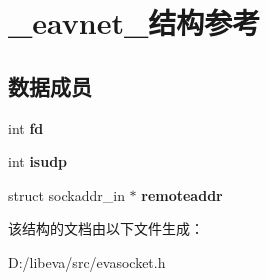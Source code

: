 \hypertarget{struct__eavnet__}{\section{\-\_\-eavnet\-\_\-结构参考}
\label{struct__eavnet__}
}
\subsection*{数据成员}
\begin{DoxyCompactItemize}
\item 
\hypertarget{struct__eavnet___a6f8059414f0228f0256115e024eeed4b}{int {\bfseries fd}}\label{struct__eavnet___a6f8059414f0228f0256115e024eeed4b}

\item 
\hypertarget{struct__eavnet___a0dc807a638900220323c33cd7964136d}{int {\bfseries isudp}}\label{struct__eavnet___a0dc807a638900220323c33cd7964136d}

\item 
\hypertarget{struct__eavnet___a08130e16431b383b476e6ace95f45e41}{struct sockaddr\-\_\-in $\ast$ {\bfseries remoteaddr}}\label{struct__eavnet___a08130e16431b383b476e6ace95f45e41}

\end{DoxyCompactItemize}


该结构的文档由以下文件生成：\begin{DoxyCompactItemize}
\item 
\-D\-:/libeva/src/evasocket.\-h\end{DoxyCompactItemize}
